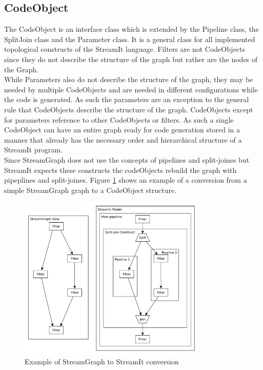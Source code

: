\documentclass[journal]{IEEEtran}
\begin{document}
\subsection{CodeObject}
\noindent The CodeObject is an interface class which is extended by the Pipeline
class, the SplitJoin class and the Parameter class. It is a general class for
all implemented topological constructs of the StreamIt language. Filters are not
CodeObjects since they do not describe the structure of the graph but rather are
the nodes of the Graph.\\
While Parameters also do not describe the structure of the graph, they may be
needed by multiple CodeObjects and are needed in different configurations while
the code is generated. As such the parameters are an exception to the general
rule that CodeObjects describe the structure of the graph. CodeObjects except
for parameters reference to other CodeObjects or filters. As such a single
CodeObject can have an entire graph ready for code generation stored in a manner
that already has the necessary order and hierarchical structure of a StreamIt
program.\\
Since StreamGraph does not use the concepts of pipelines and split-joines 
but StreamIt expects these constructs the codeObjects rebuild the graph 
with pipeplines and split-joines.
Figure \ref{fig_StreamGraph_To_StreamIt} shows an example of a 
conversion from a simple StreamGraph graph to a CodeObject structure.

\begin{figure}[h]
	\centering
	\includegraphics[width=0.8\textwidth]{StreamGraphToStreamIt}
	\caption{Example of StreamGraph to StreamIt conversion}
	\label{fig_StreamGraph_To_StreamIt}
\end{figure}
\end{document}
